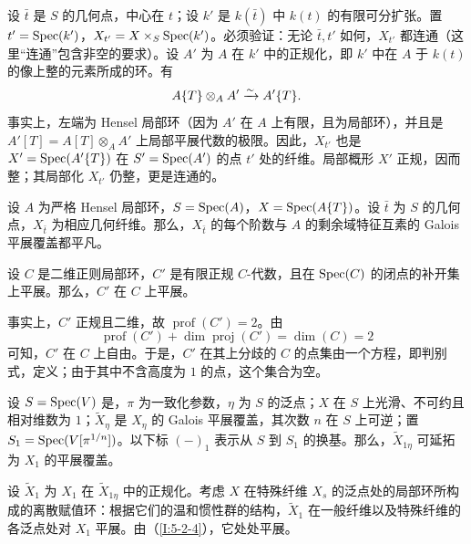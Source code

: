 设 $\bar t$ 是 $S$ 的几何点，中心在 $t$；设 $k'$ 是 $k(\bar t)$ 中 $k(t)$ 的有限可分扩张。置 $t'=\operatorname{Spec}(k')$，$X_{t'}=X\times_S\operatorname{Spec}(k')$。必须验证：无论 $\bar t,t'$ 如何，$X_{t'}$ 都连通（这里“连通”包含非空的要求）。设 $A'$ 为 $A$ 在 $k'$ 中的正规化，即 $k'$ 中在 $A$ 于 $k(t)$ 的像上整的元素所成的环。有
\[
A\{T\}\otimes_AA'\xrightarrow\sim A'\{T\}.
\]
事实上，左端为 Hensel 局部环（因为 $A'$ 在 $A$ 上有限，且为局部环），并且是 $A'[T]=A[T]\otimes_AA'$ 上局部平展代数的极限。因此，$X_{t'}$ 也是 $X'=\operatorname{Spec}(A'\{T\})$ 在 $S'=\operatorname{Spec}(A')$ 的点 $t'$ 处的纤维。局部概形 $X'$ 正规，因而整；其局部化 $X_{t'}$ 仍整，更是连通的。
\begin{proposition}\label{I:5-2-3}
设 $A$ 为严格 Hensel 局部环，$S=\operatorname{Spec}(A)$，$X=\operatorname{Spec}(A\{T\})$。设 $\bar t$ 为 $S$ 的几何点，$X_{\bar t}$ 为相应几何纤维。那么，$X_{\bar t}$ 的每个阶数与 $A$ 的剩余域特征互素的 Galois 平展覆盖都平凡。
\end{proposition}
\begingroup
\renewcommand{\thesubsubsection}{\thesection.\arabic{subsection}.3.1}
\begin{lemma}\label{I:5-2-4}
设 $C$ 是二维正则局部环，$C'$ 是有限正规 $C$-代数，且在 $\operatorname{Spec}(C)$ 的闭点的补开集上平展。那么，$C'$ 在 $C$ 上平展。
\end{lemma}
\endgroup
{}
事实上，$C'$ 正规且二维，故 $\operatorname{prof}(C')=2$。由
\[
\operatorname{prof}(C')+\dim\operatorname{proj}(C')=\dim(C)=2
\]
可知，$C'$ 在 $C$ 上自由。于是，$C'$ 在其上分歧的 $C$ 的点集由一个方程，即判别式，定义；由于其中不含高度为 $1$ 的点，这个集合为空。
\begingroup
\renewcommand{\thesubsubsection}{\thesection.\arabic{subsection}.3.2}
\begin{lemma}\label{I:5-2-5}
设 $S=\operatorname{Spec}(V)$ 是，$\pi$ 为一致化参数，$\eta$ 为 $S$ 的泛点；$X$ 在 $S$ 上光滑、不可约且相对维数为 $1$；$\widetilde X_\eta$ 是 $X_\eta$ 的 Galois 平展覆盖，其次数 $n$ 在 $S$ 上可逆；置 $S_1=\operatorname{Spec}(V[\pi^{1/n}])$。以下标 $(-)_1$ 表示从 $S$ 到 $S_1$ 的换基。那么，$\widetilde X_{1\eta}$ 可延拓为 $X_1$ 的平展覆盖。
\end{lemma}
\endgroup
设 $\widetilde X_1$ 为 $X_1$ 在 $\widetilde X_{1\eta}$ 中的正规化。考虑 $X$ 在特殊纤维 $X_s$ 的泛点处的局部环所构成的离散赋值环：根据它们的温和惯性群的结构，$\widetilde X_1$ 在一般纤维以及特殊纤维的各泛点处对 $X_1$ 平展。由（\ref{I:5-2-4}），它处处平展。
\begingroup
\renewcommand{\thesubsubsection}{\thesection.\arabic{subsection}.3.3}
